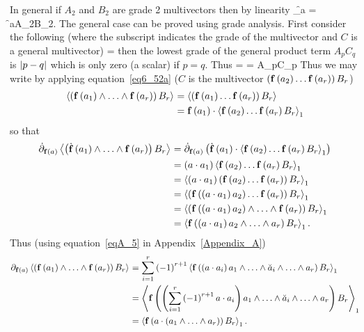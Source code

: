 In general if $A_{2}$ and $B_{2}$ are grade 2 multivectors then by linearity
\be
	\partial_{\f{\fbld}{a}} = \f{\fbld}{a\cdot A_{2}}\cdot B_{2}.
\ee 
The general case can be proved using grade analysis. First consider the following (where the subscript indicates the grade of the multivector and 
$C$ is a general multivector)
\be
     =  \label{eq6_51}
\ee
then the lowest grade of the general product term $A_{p}C_{q}$ is $\left | {p-q} \right |$ which is only zero (a scalar) if $p=q$.  Thus 
\be
     =  = A_{p}\cdot C_{p} \label{eq6_52}
\ee
Thus we may write by applying equation~\ref{eq6_52a} ($C$ is the multivector $\left ( {{\mathbf{f}}\left ( {a_{2}} \right )\dots{\mathbf{f}}\left ( {a_{r}} \right )} \right ) B_{r}$)
\begin{align}
	\grd{\paren{\f{\fbld}{a_{1}}\W\dots\W\f{\fbld}{a_{r}}}B_{r}}{} &= \grd{\paren{\f{\fbld}{a_{1}}\dots\f{\fbld}{a_{r}}}{B_{r}}}{} \nonumber \\
	                                                               &= \f{\fbld}{a_{1}}\cdot\grd{\f{\fbld}{a_{2}}\dots\f{\fbld}{a_{r}}{B_{r}}}{1}
\end{align}
so that
\begin{align}
	\dot{\partial}_{\f{\fbld}{a}}\grd{\paren{\f{\dot{\fbld}}{a_{1}}\W\dots\W\f{\fbld}{a_{r}}}B_{r}}{} 
	        &= \dot{\partial}_{\f{\fbld}{a}}\paren{\f{\dot{\fbld}}{a_{1}}\cdot\grd{\f{\fbld}{a_{2}}\dots\f{\fbld}{a_{r}}{B_{r}}}{1}} \nonumber \\
			&= \paren{a\cdot a_{1}}\grd{\f{\fbld}{a_{2}}\dots\f{\fbld}{a_{r}}{B_{r}}}{1} \nonumber \\
			&= \grd{\paren{a\cdot a_{1}}\paren{\f{\fbld}{a_{2}}\dots\f{\fbld}{a_{r}}}{B_{r}}}{1} \nonumber \\
			&= \grd{\paren{\f{\fbld}{\paren{a\cdot a_{1}}a_{2}}\dots\f{\fbld}{a_{r}}}{B_{r}}}{1} \nonumber \\
			&= \grd{\paren{\f{\fbld}{\paren{a\cdot a_{1}}a_{2}}\W\dots\W\f{\fbld}{a_{r}}}{B_{r}}}{1} \nonumber \\
			&= \grd{\f{\fbld}{\paren{a\cdot a_{1}}a_{2}\W\dots\W a_{r}}B_{r}}{1}.
\end{align}
Thus (using equation~\ref{eqA_5} in Appendix~\ref{Appendix_A})
\begin{align}
	\partial_{\f{\fbld}{a}}\grd{\paren{\f{\fbld}{a_{1}}\W\dots\W\f{\fbld}{a_{r}}}B_{r}}{}
		& = \sum_{i=1}^{r}\onep{r+1}\grd{\f{\fbld}{\paren{a\cdot a_{i}}a_{1}\W\dots\W\breve{a}_{i}\W\dots\W a_{r}}B_{r}}{1} \nonumber \\
		& = \grd{\f{\fbld}{\paren{\sum_{i=1}^{r}\onep{r+1}a\cdot a_{i}}a_{1}\W\dots\W\breve{a}_{i}\W\dots\W a_{r}}B_{r}}{1} \nonumber \\
		& = \grd{\f{\fbld}{a\cdot\paren{a_{1}\W\dots\W a_{r}}}B_{r}}{1}.\label{eq6_55}
\end{align}

